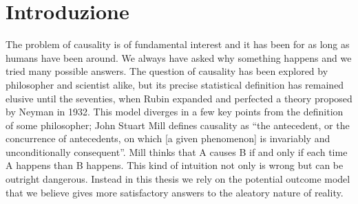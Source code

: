 \chapter{Introduzione}
\label{chapt:History Causality}
The problem of causality is of fundamental interest and it has been for as long as humans have been around. We always have asked why something happens and we tried many possible answers. The question of causality has been explored by philosopher and scientist alike, but its precise statistical definition has remained elusive until the seventies, when Rubin expanded and perfected a theory proposed by Neyman in 1932. This model diverges in a few key points from the definition of some philosopher; John Stuart Mill defines causality as  “the antecedent, or the concurrence of antecedents, on which [a given phenomenon] is invariably and unconditionally consequent”. Mill thinks that A causes B if and only if each time A happens than B happens. This kind of intuition not only is wrong but can be outright dangerous. Instead in this thesis we rely on the potential outcome model that we believe gives more satisfactory answers to the aleatory nature of reality.
